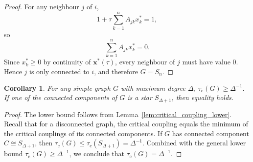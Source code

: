 \documentclass[a4paper,12pt]{article}
\newtheorem{corollary}{Corollary}
\begin{document}
\begin{proof}
    For any neighbour $j$ of $i$,
    \begin{equation*}
        1 + \tau \sum_{k=1}^{n} A_{jk} x_k^* = 1,
    \end{equation*}
    so
    \begin{equation*}
        \sum_{k=1}^{n} A_{jk} x_k^* = 0.
    \end{equation*}
    Since $x_k^* \ge 0$ by continuity of $\mathbf{x^*}(\tau)$, every neighbour of $j$ must have value $0$. Hence $j$ is only connected to $i$, and therefore $G = S_{n}$.
\end{proof}

\begin{corollary}\label{cor:remark}
    For any simple graph $G$ with maximum degree $\Delta$, $\tau_{\mathrm{c}}(G) \ge \Delta^{-1}$. If one of the connected components of $G$ is a star $S_{\Delta+1}$, then equality holds.
\end{corollary}
\begin{proof}
    The lower bound follows from Lemma~\ref{lem:critical_coupling_lower}. 
    Recall that for a disconnected graph, the critical coupling equals the minimum of the critical couplings of its connected components. If $G$ has connected component $C \cong S_{\Delta+1}$, then 
    $\tau_{\mathrm{c}}(G) \le \tau_{\mathrm{c}}(S_{\Delta+1}) = \Delta^{-1}$. Combined with the general lower bound \(\tau_{\mathrm{c}}(G) \ge \Delta^{-1}\), we conclude that
    $
    \tau_{\mathrm{c}}(G) = \Delta^{-1}.
    $
\end{proof}
\end{document}
